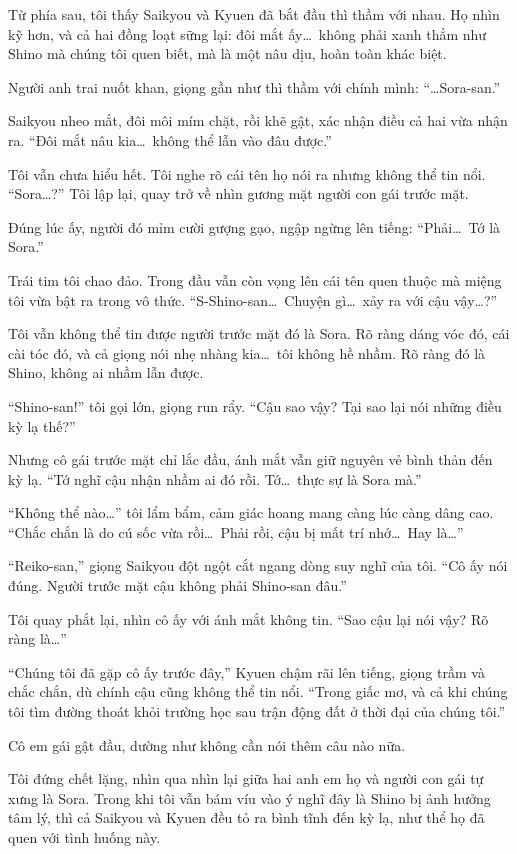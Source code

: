 \documentclass[../main.tex]{subfiles}
\begin{document}
Từ phía sau, tôi thấy Saikyou và Kyuen đã bắt đầu thì thầm với nhau. Họ nhìn kỹ hơn, và cả hai đồng loạt sững lại: đôi mắt ấy\dots\ không phải xanh thẳm như Shino mà chúng tôi quen biết, mà là một nâu dịu, hoàn toàn khác biệt.

Người anh trai nuốt khan, giọng gần như thì thầm với chính mình: ``\dots Sora-san.''

Saikyou nheo mắt, đôi môi mím chặt, rồi khẽ gật, xác nhận điều cả hai vừa nhận ra. ``Đôi mắt nâu kia\dots\ không thể lẫn vào đâu được.''

Tôi vẫn chưa hiểu hết. Tôi nghe rõ cái tên họ nói ra nhưng không thể tin nổi. ``Sora\dots?'' Tôi lập lại, quay trở về nhìn gương mặt người con gái trước mặt.

Đúng lúc ấy, người đó mỉm cười gượng gạo, ngập ngừng lên tiếng: ``Phải\dots\ Tớ là Sora.''

Trái tim tôi chao đảo. Trong đầu vẫn còn vọng lên cái tên quen thuộc mà miệng tôi vừa bật ra trong vô thức. ``S-Shino-san\dots\ Chuyện gì\dots\ xảy ra với cậu vậy\dots?''

Tôi vẫn không thể tin được người trước mặt đó là Sora. Rõ ràng dáng vóc đó, cái cài tóc đó, và cả giọng nói nhẹ nhàng kia\dots\ tôi không hề nhầm. Rõ ràng đó là Shino, không ai nhầm lẫn được.

``Shino-san!'' tôi gọi lớn, giọng run rẩy. ``Cậu sao vậy? Tại sao lại nói những điều kỳ lạ thế?''

Nhưng cô gái trước mặt chỉ lắc đầu, ánh mắt vẫn giữ nguyên vẻ bình thản đến kỳ lạ. ``Tớ nghĩ cậu nhận nhầm ai đó rồi. Tớ\dots\ thực sự là Sora mà.''

``Không thể nào\dots'' tôi lẩm bẩm, cảm giác hoang mang càng lúc càng dâng cao. ``Chắc chắn là do cú sốc vừa rồi\dots\ Phải rồi, cậu bị mất trí nhớ\dots\ Hay là\dots''

``Reiko-san,'' giọng Saikyou đột ngột cắt ngang dòng suy nghĩ của tôi. ``Cô ấy nói đúng. Người trước mặt cậu không phải Shino-san đâu.''

Tôi quay phắt lại, nhìn cô ấy với ánh mắt không tin. ``Sao cậu lại nói vậy? Rõ ràng là\dots''

``Chúng tôi đã gặp cô ấy trước đây,'' Kyuen chậm rãi lên tiếng, giọng trầm và chắc chắn, dù chính cậu cũng không thể tin nổi. ``Trong giấc mơ, và cả khi chúng tôi tìm đường thoát khỏi trường học sau trận động đất ở thời đại của chúng tôi.''

Cô em gái gật đầu, dường như không cần nói thêm câu nào nữa.

Tôi đứng chết lặng, nhìn qua nhìn lại giữa hai anh em họ và người con gái tự xưng là Sora. Trong khi tôi vẫn bám víu vào ý nghĩ đây là Shino bị ảnh hưởng tâm lý, thì cả Saikyou và Kyuen đều tỏ ra bình tĩnh đến kỳ lạ, như thể họ đã quen với tình huống này.
\end{document}
